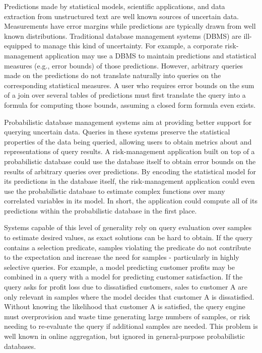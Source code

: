 Predictions made by statistical models, scientific applications, and data extraction from unstructured text are well known sources of uncertain data.  Measurements have error margins while predictions are typically drawn from well known distributions.  Traditional database management systems (DBMS) are ill-equipped to manage this kind of uncertainty.  For example, a corporate risk-management application may use a DBMS to maintain predictions and statistical measures (e.g., error bounds) of those predictions.  However, arbitrary queries made on the predictions do not translate naturally into queries on the corresponding statistical measures.  A user who requires error bounds on the sum of a join over several tables of predictions must first translate the query into a formula for computing those bounds, assuming a closed form formula even exists.

Probabilistic  database  management  systems \cite{dalvi07efficient, WidomTrio2008, KochMayBMS2008, SD2007, ORION, MCDB, BayesStore} aim at providing better support for querying uncertain data.  Queries in these systems preserve the statistical properties of the data being queried, allowing users to obtain metrics about and representations of query results.  A risk-management application built on top of a probabilistic database could use the database itself to obtain error bounds on the results of arbitrary queries over predictions.  By encoding the statistical model for its predictions in the database itself, the risk-management application could even use the probabilistic database to estimate complex functions over many correlated variables in its model.  In short, the application could compute all of its predictions within the probabilistic database in the first place.

Systems capable of this level of generality rely on query evaluation over samples to estimate desired values, as exact solutions can be hard to obtain.  If the query contains a selection predicate, samples violating the predicate do not contribute to the expectation and increase the need for samples - particularly in highly selective queries.  For example, a model predicting customer profits may be combined in a query with a model for predicting customer satisfaction.  If the query asks for profit loss due to dissatisfied customers, sales to customer A are only relevant in samples where the model decides that customer A is dissatisfied.  Without knowing the likelihood that customer A is satisfied, the query engine must overprovision and waste time generating large numbers of samples, or risk needing to re-evaluate the query if additional samples are needed.  This problem is well known in online aggregation, but ignored in general-purpose probabilistic databases.  

